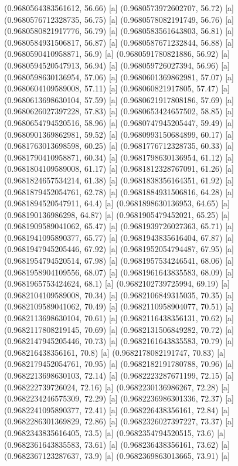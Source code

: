 {{{(0.9680564383561612, 56.66) [a] 
(0.9680573972602707, 56.72) [a] 
(0.9680576712328735, 56.75) [a] 
(0.9680578082191749, 56.76) [a] 
(0.9680580821917776, 56.79) [a] 
(0.9680583561643803, 56.81) [a] 
(0.9680584931506817, 56.87) [a] 
(0.9680587671232844, 56.88) [a] 
(0.9680590410958871, 56.9) [a] 
(0.9680591780821886, 56.92) [a] 
(0.9680594520547913, 56.94) [a] 
(0.968059726027394, 56.96) [a] 
(0.9680598630136954, 57.06) [a] 
(0.9680601369862981, 57.07) [a] 
(0.9680604109589008, 57.11) [a] 
(0.968060821917805, 57.47) [a] 
(0.9680613698630104, 57.59) [a] 
(0.9680621917808186, 57.69) [a] 
(0.9680626027397228, 57.83) [a] 
(0.9680653424657502, 58.85) [a] 
(0.9680654794520516, 58.96) [a] 
(0.9680747945205447, 59.49) [a] 
(0.9680901369862981, 59.52) [a] 
(0.9680993150684899, 60.17) [a] 
(0.9681763013698598, 60.25) [a] 
(0.9681776712328735, 60.33) [a] 
(0.9681790410958871, 60.34) [a] 
(0.9681798630136954, 61.12) [a] 
(0.9681804109589008, 61.17) [a] 
(0.9681812328767091, 61.26) [a] 
(0.9681824657534214, 61.38) [a] 
(0.9681838356164351, 61.92) [a] 
(0.9681879452054761, 62.78) [a] 
(0.9681884931506816, 64.28) [a] 
(0.9681894520547911, 64.4) [a] 
(0.9681898630136953, 64.65) [a] 
(0.968190136986298, 64.87) [a] 
(0.9681905479452021, 65.25) [a] 
(0.9681909589041062, 65.47) [a] 
(0.9681939726027363, 65.71) [a] 
(0.9681941095890377, 65.77) [a] 
(0.9681943835616404, 67.87) [a] 
(0.9681947945205446, 67.92) [a] 
(0.9681952054794487, 67.95) [a] 
(0.9681954794520514, 67.98) [a] 
(0.9681957534246541, 68.06) [a] 
(0.9681958904109556, 68.07) [a] 
(0.9681961643835583, 68.09) [a] 
(0.9681965753424624, 68.1) [a] 
(0.9682102739725994, 69.19) [a] 
(0.9682104109589008, 70.34) [a] 
(0.9682106849315035, 70.35) [a] 
(0.9682109589041062, 70.49) [a] 
(0.9682110958904077, 70.51) [a] 
(0.9682113698630104, 70.61) [a] 
(0.9682116438356131, 70.62) [a] 
(0.9682117808219145, 70.69) [a] 
(0.9682131506849282, 70.72) [a] 
(0.9682147945205446, 70.73) [a] 
(0.9682161643835583, 70.79) [a] 
(0.968216438356161, 70.8) [a] 
(0.9682178082191747, 70.83) [a] 
(0.9682179452054761, 70.95) [a] 
(0.9682182191780788, 70.96) [a] 
(0.9682213698630103, 72.14) [a] 
(0.9682223287671199, 72.15) [a] 
(0.968222739726024, 72.16) [a] 
(0.9682230136986267, 72.28) [a] 
(0.9682234246575309, 72.29) [a] 
(0.9682236986301336, 72.37) [a] 
(0.9682241095890377, 72.41) [a] 
(0.968226438356161, 72.84) [a] 
(0.9682286301369829, 72.86) [a] 
(0.9682326027397227, 73.37) [a] 
(0.9682343835616405, 73.5) [a] 
(0.9682354794520515, 73.6) [a] 
(0.9682361643835583, 73.61) [a] 
(0.968236438356161, 73.62) [a] 
(0.9682367123287637, 73.9) [a] 
(0.9682369863013665, 73.91) [a] 
}}}
